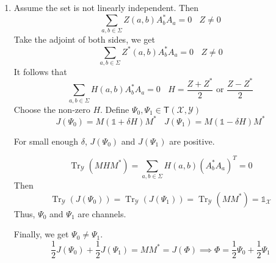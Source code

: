 \documentclass[aps,pra,onecolumn,notitlepage,superscriptaddress]{revtex4-1}
\newcommand{\spc}[1]{\mathcal{#1}}
\newcommand{\T}{\mathsf{T}}
\newcommand{\Tr}{\operatorname{Tr}}
\newcommand\I{\mathds{1}}
\begin{document}
{\begin{enumerate}
            \item Assume the set is not linearly independent. Then
            \begin{equation}
                \sum_{a,b \in \Sigma} Z(a,b) A_b^*A_a = 0 \ \ \ \ Z \neq 0
            \end{equation}
            Take the adjoint of both sides, we get
            \begin{equation}
                \sum_{a,b \in \Sigma} Z^*(a,b) A_b^*A_a = 0 \ \ \ \ Z \neq 0
            \end{equation}
            It follows that 
            \begin{equation}
                \sum_{a,b \in \Sigma} H(a,b) A_b^*A_a = 0 \ \ \ \ H = \frac{Z+Z^*}{2} \text{ or } \frac{Z-Z^*}{2}
            \end{equation}
            Choose the non-zero $H$. Define $\Psi_0, \Psi_1 \in \T(\spc X, \spc Y)$
            \begin{equation}
                J(\Psi_0) = M (\I + \delta H) M^* \ \ \ \ 
                J(\Psi_1) = M (\I - \delta H) M^*
            \end{equation}

            For small enough $\delta$, $J(\Psi_0)$ and $J(\Psi_1)$ are positive.

            \begin{equation}
                \Tr_{\spc Y}(MHM^*) = \sum_{a,b \in \Sigma} H(a,b)(A_b^*A_a)^T = 0
            \end{equation}
            Then
            \begin{equation}
                \Tr_{\spc Y}(J(\Psi_0)) = \Tr_{\spc Y}(J(\Psi_1)) = \Tr_{\spc Y}(MM^*) = \I_{\spc X}
            \end{equation}
            Thus, $\Psi_0$ and $\Psi_1$ are channels.

            Finally, we get $\Psi_0 \neq \Psi_1$.
            \begin{equation}
                \frac{1}{2}J(\Psi_0) + \frac{1}{2}J(\Psi_1) = MM^* = J(\Phi) \implies \Phi = \frac{1}{2}\Psi_0 + \frac{1}{2}\Psi_1
            \end{equation}
        \end{enumerate}
    }
\end{document}
